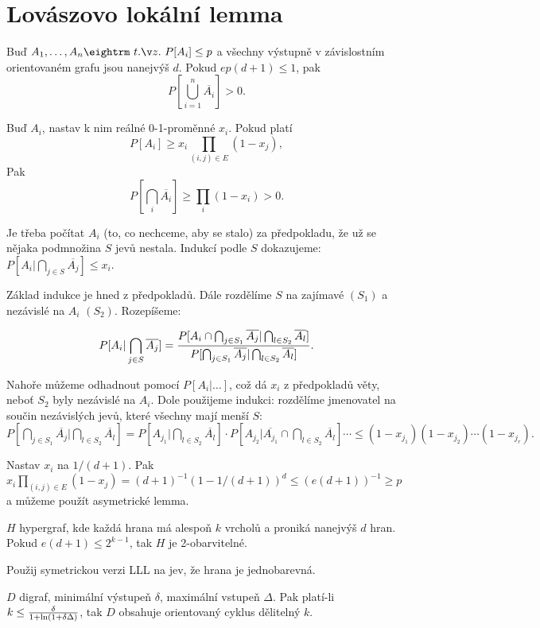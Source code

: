 \section{Lovászovo lokální lemma}

 Buď $A_1, \dots, A_n \st P[A_i] \le p$ a všech\-ny vý\-stup\-ně v zá\-vi\-slostním
orientovaném grafu jsou nanejvýš $d$. Pokud $ep(d+1) \le 1$, pak 
$$P[\bigcup_{i=1}^n \overline{A_i}] > 0.$$

 Buď $A_i$, nastav k nim reálné 0-1-proměnné $x_i$. Pokud platí
$$P[A_i] \ge x_i \prod_{(i,j) \in E} (1-x_j), $$
Pak
$$P[\bigcap_i \overline{A_i}] \ge \prod_i (1-x_i) > 0.$$

\prf{} Je třeba počítat $A_i$ (to, co nechceme, aby se stalo) za předpokladu, že
už se nějaka podmnožina $S$ jevů nestala. Indukcí podle $S$ dokazujeme: $ P[A_i|\bigcap_{j \in S} \overline{A_j}] \le x_i.$

Základ indukce je hned z předpokladů. Dále rozdělíme $S$ na zajímavé $(S_1)$ a nezávislé na $A_i$ $(S_2)$.
Rozepíšeme:

$$P[A_i | \bigcap_{j \in S} \overline{A_j}] =
{P[A_i \cap \bigcap_{j \in S_1} \overline{A_j} | \bigcap_{l \in S_2} \overline{A_l}] \over
 P[\bigcap_{j \in S_1} \overline{A_j} | \bigcap_{l \in S_2} \overline{A_l}]}.
$$

Nahoře můžeme odhadnout pomocí $P[A_i | \dots]$, což dá $x_i$ z předpokladů věty,
neboť $S_2$ byly nezávislé na $A_i$. Dole použijeme indukci: rozdělíme jmenovatel
na součin nezávislých jevů, které všechny mají menší $S$:
$P[\bigcap_{j \in S_1} \overline{A_j} | \bigcap_{l \in S_2} \overline{A_l}] = 
P[A_{j_1} | \bigcap_{l \in S_2} \overline{A_l}] \cdot P[A_{j_2} | \overline{A_{j_1}} \cap \bigcap_{l \in S_2} \overline{A_l}] \cdots
\le (1-x_{j_1})(1-x_{j_2}) \cdots (1-x_{j_r}).$

 Nastav $x_i$ na $1/(d+1)$. Pak $x_i \prod_{(i,j) \in E} (1-x_j) = (d+1)^{-1} \left( 1 - 1/(d+1)\right)^{d} \le (e(d+1))^{-1}
\ge p$ a můžeme použít asymetrické lemma.


 $H$ hypergraf, kde každá hrana má alespoň $k$ vrcholů
a proniká nanejvýš $d$ hran. Pokud $e(d+1) \le 2^{k-1}$, tak $H$ je 2-obarvitelné.

\prf{} Použij symetrickou verzi LLL na jev, že hrana je jednobarevná.

 $D$ digraf, minimální výstupeň $\delta$, maximální vstupeň
$\Delta$. Pak platí-li $k \le {\delta \over 1 + \ln(1+\delta\Delta)}$, tak $D$ obsahuje
orientovaný cyklus dělitelný $k$.

